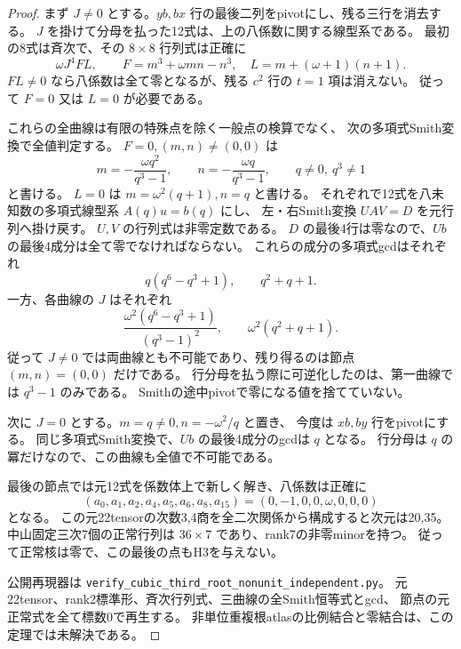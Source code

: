 \begin{proof}
まず $J\ne0$ とする。$yb,bx$ 行の最後二列をpivotにし、残る三行を消去する。
$J$ を掛けて分母を払った12式は、上の八係数に関する線型系である。
最初の8式は斉次で、その $8\times8$ 行列式は正確に
\[
 \omega J^4 F L,\qquad
 F=m^3+\omega mn-n^3,\quad
 L=m+(\omega+1)(n+1).
\]
$FL\ne0$ なら八係数は全て零となるが、残る $c^2$ 行の $t=1$ 項は消えない。
従って $F=0$ 又は $L=0$ が必要である。

これらの全曲線は有限の特殊点を除く一般点の検算でなく、
次の多項式Smith変換で全値判定する。
$F=0,(m,n)\ne(0,0)$ は
\[
 m=-\frac{\omega q^2}{q^3-1},\qquad
 n=-\frac{\omega q}{q^3-1},\qquad q\ne0,\ q^3\ne1
\]
と書ける。
$L=0$ は $m=\omega^2(q+1),n=q$ と書ける。
それぞれで12式を八未知数の多項式線型系 $A(q)u=b(q)$ にし、
左・右Smith変換 $U A V=D$ を元行列へ掛け戻す。
$U,V$ の行列式は非零定数である。
$D$ の最後4行は零なので、$Ub$ の最後4成分は全て零でなければならない。
これらの成分の多項式gcdはそれぞれ
\[
 q(q^6-q^3+1),\qquad q^2+q+1.
\]
一方、各曲線の $J$ はそれぞれ
\[
 \frac{\omega^2(q^6-q^3+1)}{(q^3-1)^2},\qquad
 \omega^2(q^2+q+1).
\]
従って $J\ne0$ では両曲線とも不可能であり、残り得るのは節点 $(m,n)=(0,0)$ だけである。
行分母を払う際に可逆化したのは、第一曲線では $q^3-1$ のみである。
Smithの途中pivotで零になる値を捨てていない。

次に $J=0$ とする。$m=q\ne0,n=-\omega^2/q$ と置き、
今度は $xb,by$ 行をpivotにする。
同じ多項式Smith変換で、$Ub$ の最後4成分のgcdは $q$ となる。
行分母は $q$ の冪だけなので、この曲線も全値で不可能である。

最後の節点では元12式を係数体上で新しく解き、八係数は正確に
\[
 (a_0,a_1,a_2,a_4,a_5,a_6,a_8,a_{15})
 =(0,-1,0,0,\omega,0,0,0)
\]
となる。
この元22tensorの次数3,4商を全二次関係から構成すると次元は20,35。
中山固定三次7個の正常行列は $36\times7$ であり、rank7の非零minorを持つ。
従って正常核は零で、この最後の点もH3を与えない。

公開再現器は \texttt{verify\_cubic\_third\_root\_nonunit\_independent.py}。
元22tensor、rank2標準形、斉次行列式、三曲線の全Smith恒等式とgcd、
節点の元正常式を全て標数0で再生する。
非単位重複根atlasの比例結合と零結合は、この定理では未解決である。
\end{proof}
